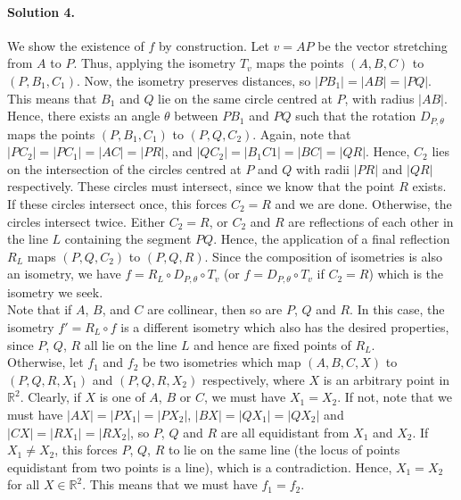 \documentclass[10pt]{article}
\begin{document}
        \paragraph{Solution 4.} We show the existence of $f$ by construction. Let $v = AP$ be the vector stretching from
        $A$ to $P$. Thus, applying the isometry $T_v$ maps the points $(A, B, C)$ to $(P, B_1, C_1)$.
        Now, the isometry preserves distances, so $|PB_1| = |AB| = |PQ|$. This means that $B_1$ and $Q$ lie on the 
        same circle centred at $P$, with radius $|AB|$. Hence, there exists an angle $\theta$ between $PB_1$ and $PQ$ such that
        the rotation $D_{P, \theta}$ maps the points $(P, B_1, C_1)$ to $(P, Q, C_2)$. Again, 
        note that $|PC_2| = |PC_1| = |AC| = |PR|$, and $|QC_2| = |B_1C1| = |BC| = |QR|$. Hence, $C_2$ lies on the intersection
        of the circles centred at $P$ and $Q$ with radii $|PR|$ and $|QR|$ respectively. These circles must intersect,
        since we know that the point $R$ exists. If these circles intersect once, this forces $C_2 = R$ and we are done.
        Otherwise, the circles intersect twice. Either $C_2 = R$, or $C_2$ and $R$ are reflections of each other in the line $L$ containing the 
        segment $PQ$. Hence, the application of a final reflection $R_L$ maps $(P, Q, C_2)$ to $(P, Q, R)$.
        Since the composition of isometries is also an isometry, we have $f = R_{L}\circ D_{P,\theta}\circ T_v$
        (or $f = D_{P,\theta}\circ T_v$ if $C_2 = R$) which is the isometry we seek. \\

        Note that if $A$, $B$, and $C$ are collinear, then so are $P$, $Q$ and $R$.
        In this case, the isometry $f' = R_{L} \circ f$ is a different isometry which also has the desired properties,
        since $P$, $Q$, $R$ all lie on the line $L$ and hence are fixed points of $R_L$. \\
        Otherwise, let $f_1$ and $f_2$ be two isometries which map $(A, B, C, X)$ to $(P, Q, R, X_1)$ and $(P, Q, R, X_2)$ respectively,
        where $X$ is an arbitrary point in $\mathbb{R}^2$. Clearly, if $X$ is one of $A$, $B$ or $C$, we must have $X_1 = X_2$.
        If not, note that we must have $|AX| = |PX_1| = |PX_2|$, $|BX| = |QX_1| = |QX_2|$ and $|CX| = |RX_1| = |RX_2|$,
        so $P$, $Q$ and $R$ are all equidistant from $X_1$ and $X_2$. If $X_1 \neq X_2$, this forces $P$, $Q$, $R$ to lie
        on the same line (the locus of points equidistant from two points is a line), which is a contradiction. Hence,
        $X_1 = X_2$ for all $X \in \mathbb{R}^2$. This means that we must have $f_1 = f_2$. \\
\end{document}
